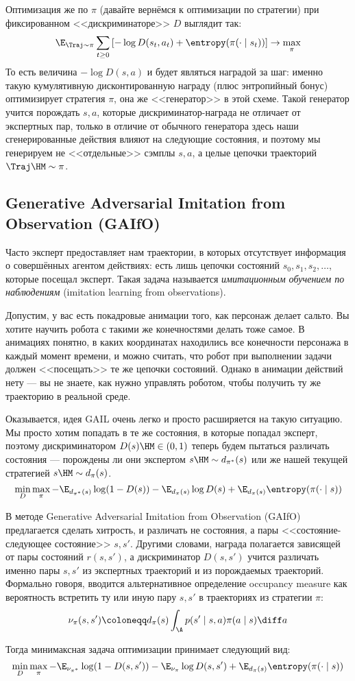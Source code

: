 Оптимизация же по $\pi$ (давайте вернёмся к оптимизации по стратегии) при фиксированном <<дискриминаторе>> $D$ выглядит так:
$$
\E_{\Traj \sim \pi} \sum_{t \ge 0} \left[ -\log D(s_t, a_t) + \entropy(\pi(\cdot \mid s_t)) \right] \to \max\limits_{\pi}
$$
То есть величина $-\log D(s, a)$ и будет являться наградой за шаг: именно такую кумулятивную дисконтированную награду (плюс энтропийный бонус) оптимизирует стратегия $\pi$, она же <<генератор>> в этой схеме. Такой генератор учится порождать $s, a$, которые дискриминатор-награда не отличает от экспертных пар, только в отличие от обычного генератора здесь наши сгенерированные действия влияют на следующие состояния, и поэтому мы генерируем не <<отдельные>> сэмплы $s, a$, а целые цепочки траекторий $\Traj \HM\sim \pi$. 

\subsection{Generative Adversarial Imitation from Observation (GAIfO)}

Часто эксперт предоставляет нам траектории, в которых отсутствует информация о совершённых агентом действиях: есть лишь цепочки состояний $s_0, s_1, s_2, \dots$, которые посещал эксперт. Такая задача называется \emph{имитационным обучением по наблюдениям} (imitation learning from observations).

\begin{example}
Допустим, у вас есть покадровые анимации того, как персонаж делает сальто. Вы хотите научить робота с такими же конечностями делать тоже самое. В анимациях понятно, в каких координатах находились все конечности персонажа в каждый момент времени, и можно считать, что робот при выполнении задачи должен <<посещать>> те же цепочки состояний. Однако в анимации действий нету --- вы не знаете, как нужно управлять роботом, чтобы получить ту же траекторию в реальной среде.
\end{example}

Оказывается, идея GAIL очень легко и просто расширяется на такую ситуацию. Мы просто хотим попадать в те же состояния, в которые попадал эксперт, поэтому дискриминатором $D(s) \HM \in (0, 1)$ теперь будем пытаться различать состояния --- порождены ли они экспертом $s \HM\sim d_{\pi^*}(s)$ или же нашей текущей стратегией $s \HM\sim d_{\pi}(s)$.
$$
\min\limits_{D} \max\limits_{\pi} -\E_{d_{\pi^*}(s)} \log (1 - D(s)) - \E_{d_{\pi}(s)} \log D(s) + \E_{d_\pi(s)}\entropy(\pi(\cdot \mid s))
$$

В методе Generative Adversarial Imitation from Observation (GAIfO) предлагается сделать хитрость, и различать не состояния, а пары <<состояние-следующее состояние>> $s, s'$. Другими словами, награда полагается зависящей от пары состояний $r(s, s')$, а дискриминатор $D(s, s')$ учится различать именно пары $s, s'$ из экспертных траекторий и из порождаемых траекторий. Формально говоря, вводится альтернативное определение occupancy measure как вероятность встретить ту или иную пару $s, s'$ в траекториях из стратегии $\pi$:
$$
\nu_\pi(s, s') \coloneqq d_\pi(s) \int_\A p(s' \mid s, a) \pi(a \mid s) \diff a
$$

Тогда минимаксная задача оптимизации принимает следующий вид:
$$
\min\limits_{D} \max\limits_{\pi} -\E_{\nu_{\pi^*}} \log (1 - D(s, s')) - \E_{\nu_\pi} \log D(s, s') + \E_{d_\pi(s)}\entropy(\pi(\cdot \mid s))
$$

